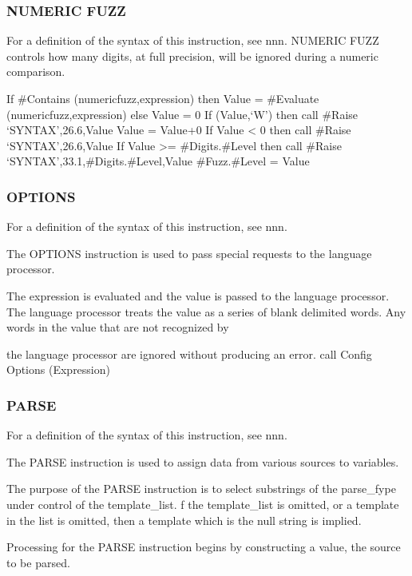 \hypertarget{numeric-fuzz}{%
\subsubsection{NUMERIC FUZZ}\label{numeric-fuzz}}

For a definition of the syntax of this instruction, see nnn. NUMERIC
FUZZ controls how many digits, at full precision, will be ignored during
a numeric comparison.

If \#Contains (numericfuzz,expression) then Value = \#Evaluate
(numericfuzz,expression) else Value = 0 If \datatype(Value,`W') then
call \#Raise `SYNTAX',26.6,Value Value = Value+0 If Value \textless{} 0
then call \#Raise `SYNTAX',26.6,Value If Value \textgreater=
\#Digits.\#Level then call \#Raise `SYNTAX',33.1,\#Digits.\#Level,Value
\#Fuzz.\#Level = Value

\hypertarget{options}{%
\subsubsection{OPTIONS}\label{options}}

For a definition of the syntax of this instruction, see nnn.

The OPTIONS instruction is used to pass special requests to the language
processor.

The expression is evaluated and the value is passed to the language
processor. The language processor treats the value as a series of blank
delimited words. Any words in the value that are not recognized by

the language processor are ignored without producing an error. call
Config Options (Expression)

\hypertarget{parse}{%
\subsubsection{PARSE}\label{parse}}

For a definition of the syntax of this instruction, see nnn.

The PARSE instruction is used to assign data from various sources to
variables.

The purpose of the PARSE instruction is to select substrings of the
parse\_fype under control of the template\_list. \textbar f the
template\_list is omitted, or a template in the list is omitted, then a
template which is the null string is implied.

Processing for the PARSE instruction begins by constructing a value, the
source to be parsed.

